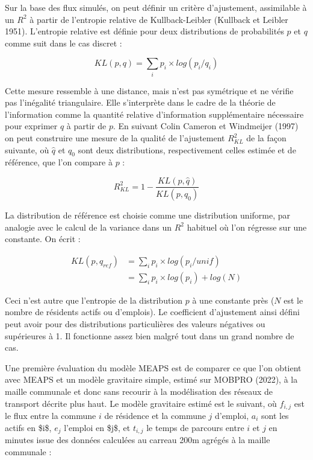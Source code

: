 \documentclass[
  10pt,
  a4paper,
  numbers=noendperiod,
  DIV=9]{scrartcl}
\begin{document}
Sur la base des flux simulés, on peut définir un critère d'ajustement,
assimilable à un \(R^2\) à partir de l'entropie relative de
Kullback-Leibler (Kullback et Leibler 1951). L'entropie relative est
définie pour deux distributions de probabilités \(p\) et \(q\) comme
suit dans le cas discret :

\[
KL(p,q) = \sum_{i}p_i \times log(p_i/q_i)
\]

Cette mesure ressemble à une distance, mais n'est pas symétrique et ne
vérifie pas l'inégalité triangulaire. Elle s'interprète dans le cadre de
la théorie de l'information comme la quantité relative d'information
supplémentaire nécessaire pour exprimer \(q\) à partir de \(p\). En
suivant Colin Cameron et Windmeijer (1997) on peut construire une mesure
de la qualité de l'ajustement \(R_{KL}^2\) de la façon suivante, où
\(\hat{q}\) et \(q_0\) sont deux distributions, respectivement celles
estimée et de référence, que l'on compare à \(p\) :

\[
R_{KL}^2 = 1 - \frac{KL(p,\hat{q})}{KL(p, q_0)}
\]

La distribution de référence est choisie comme une distribution
uniforme, par analogie avec le calcul de la variance dans un \(R^2\)
habituel où l'on régresse sur une constante. On écrit :

\[
\begin{aligned}
KL(p,q_{ref}) &{}= \sum_{i}p_i \times log(p_i/unif) \\&{}= \sum_i p_i \times log(p_i) + log(N)
\end{aligned}
\]

Ceci n'est autre que l'entropie de la distribution \(p\) à une constante
près (\(N\) est le nombre de résidents actifs ou d'emplois). Le
coefficient d'ajustement ainsi défini peut avoir pour des distributions
particulières des valeurs négatives ou supérieures à 1. Il fonctionne
assez bien malgré tout dans un grand nombre de cas.

Une première évaluation du modèle MEAPS est de comparer ce que l'on
obtient avec MEAPS et un modèle gravitaire simple, estimé sur MOBPRO
(2022), à la maille communale et donc sans recourir à la modélisation
des réseaux de transport décrite plus haut. Le modèle gravitaire estimé
est le suivant, où \(f_{i,j}\) est le flux entre la commune \(i\) de
résidence et la commune \(j\) d'emploi, \(a_i\) sont les actifs en
\$i\$, \(e_j\) l'emploi en \$j\$, et \(t_{i,j}\) le temps de parcours
entre \(i\) et \(j\) en minutes issue des données calculées au carreau
200m agrégés à la maille communale :
\end{document}
